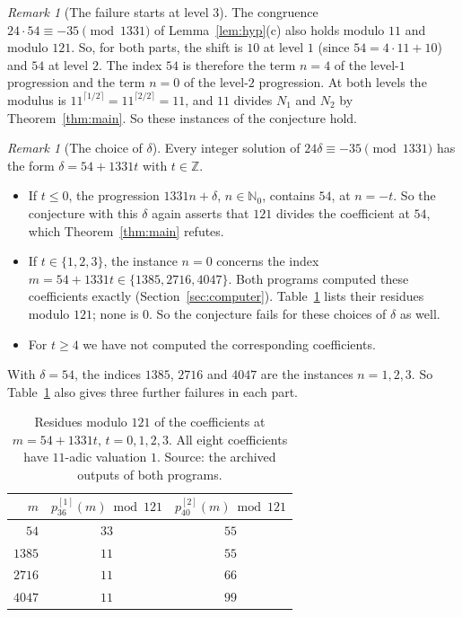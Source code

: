 \documentclass[11pt]{amsart}
\theoremstyle{definition}
\theoremstyle{remark}
\newtheorem{remark}[theorem]{Remark}
\newcommand{\Z}{\mathbb{Z}}
\newcommand{\N}{\mathbb{N}}
\newcommand{\pone}[1]{p^{[1]}_{#1}}
\newcommand{\ptwo}[1]{p^{[2]}_{#1}}
\begin{document}
\begin{remark}[The failure starts at level \(3\)]\label{rem:levels}
The congruence \(24\cdot54\equiv-35\pmod{1331}\) of Lemma~\ref{lem:hyp}(c) also holds modulo \(11\) and modulo \(121\). So, for both parts, the shift is \(10\) at level \(1\) (since \(54=4\cdot11+10\)) and \(54\) at level \(2\). The index \(54\) is therefore the term \(n=4\) of the level-\(1\) progression and the term \(n=0\) of the level-\(2\) progression. At both levels the modulus is \(11^{\lceil1/2\rceil}=11^{\lceil2/2\rceil}=11\), and \(11\) divides \(N_1\) and \(N_2\) by Theorem~\ref{thm:main}. So these instances of the conjecture hold.
\end{remark}

\begin{remark}[The choice of \(\delta\)]\label{rem:delta}
Every integer solution of \(24\delta\equiv-35\pmod{1331}\) has the form \(\delta=54+1331t\) with \(t\in\Z\).
\begin{itemize}
\item If \(t\le0\), the progression \(1331n+\delta\), \(n\in\N_0\), contains \(54\), at \(n=-t\). So the conjecture with this \(\delta\) again asserts that \(121\) divides the coefficient at \(54\), which Theorem~\ref{thm:main} refutes.
\item If \(t\in\{1,2,3\}\), the instance \(n=0\) concerns the index \(m=54+1331t\in\{1385,2716,4047\}\). Both programs computed these coefficients exactly (Section~\ref{sec:computer}). Table~\ref{tab:shifts} lists their residues modulo \(121\); none is \(0\). So the conjecture fails for these choices of \(\delta\) as well.
\item For \(t\ge4\) we have not computed the corresponding coefficients.
\end{itemize}
With \(\delta=54\), the indices \(1385\), \(2716\) and \(4047\) are the instances \(n=1,2,3\). So Table~\ref{tab:shifts} also gives three further failures in each part.
\end{remark}

\begin{table}[ht]
\caption{Residues modulo \(121\) of the coefficients at \(m=54+1331t\), \(t=0,1,2,3\). All eight coefficients have \(11\)-adic valuation \(1\). Source: the archived outputs of both programs.}\label{tab:shifts}
\begin{tabular}{rcc}\toprule
\(m\) & \(\pone{36}(m)\bmod 121\) & \(\ptwo{40}(m)\bmod 121\)\\ \midrule
\(54\) & \(33\) & \(55\)\\
\(1385\) & \(11\) & \(55\)\\
\(2716\) & \(11\) & \(66\)\\
\(4047\) & \(11\) & \(99\)\\ \bottomrule
\end{tabular}
\end{table}
\end{document}
